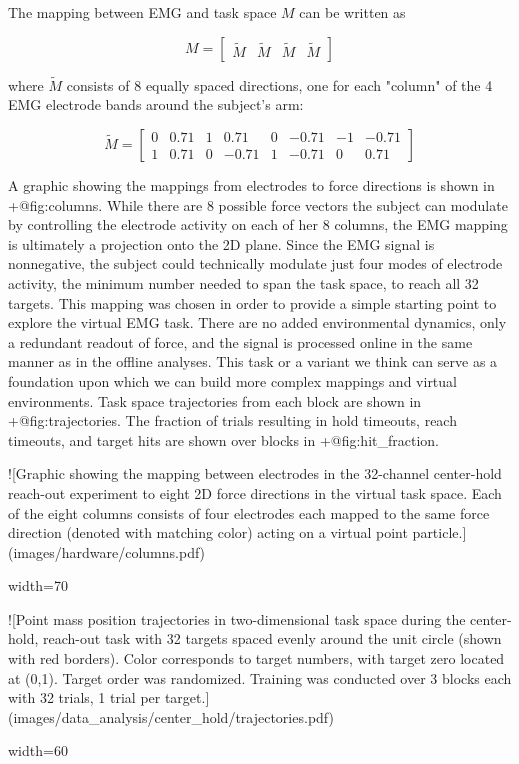 \documentclass[../main.tex]{subfiles}
\begin{document}
{{{{{{The mapping between EMG and task space $M$ can be written as

$$
M = \begin{bmatrix}\tilde{M} & \tilde{M} & \tilde{M} & \tilde{M}\end{bmatrix}
$$

where $\tilde{M}$ consists of 8 equally spaced directions, one for each "column" of the 4 EMG electrode bands around the subject's arm:

$$
\tilde{M} =
\begin{bmatrix}
0  & 0.71  & 1   & 0.71   & 0  & -0.71  & -1  & -0.71 \\
1  & 0.71  & 0  & -0.71  & 1   & -0.71   & 0   & 0.71
\end{bmatrix}
$$

A graphic showing the mappings from electrodes to force directions is shown in {+@fig:columns}. While there are 8 possible force vectors the subject can modulate by controlling the electrode activity on each of her 8 columns, the EMG mapping is ultimately a projection onto the 2D plane. Since the EMG signal is nonnegative, the subject could technically modulate just four modes of electrode activity, the minimum number needed to span the task space, to reach all 32 targets. This mapping was chosen in order to provide a simple starting point to explore the virtual EMG task. There are no added environmental dynamics, only a redundant readout of force, and the signal is processed online in the same manner as in the offline analyses. This task or a variant we think can serve as a foundation upon which we can build more complex mappings and virtual environments. Task space trajectories from each block are shown in {+@fig:trajectories}. The fraction of trials resulting in hold timeouts, reach timeouts, and target hits are shown over blocks in {+@fig:hit_fraction}.

![Graphic showing the mapping between electrodes in the 32-channel center-hold reach-out experiment to eight 2D force directions in the virtual task space. Each of the eight columns consists of four electrodes each mapped to the same force direction (denoted with matching color) acting on a virtual point particle.](images/hardware/columns.pdf){width=70%

![Point mass position trajectories in two-dimensional task space during the center-hold, reach-out task with 32 targets spaced evenly around the unit circle (shown with red borders). Color corresponds to target numbers, with target zero located at (0,1). Target order was randomized. Training was conducted over 3 blocks each with 32 trials, 1 trial per target.](images/data_analysis/center_hold/trajectories.pdf){width=60%

}}}}}}}}
\end{document}
